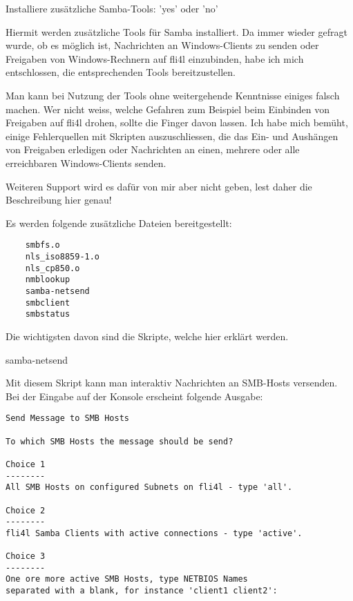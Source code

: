     Installiere zusätzliche Samba-Tools: 'yes' oder 'no'

    Hiermit werden zusätzliche Tools für Samba installiert.
    Da immer wieder gefragt wurde, ob es möglich ist, Nachrichten an
    Windows-Clients zu senden oder Freigaben von Windows-Rechnern auf fli4l
    einzubinden, habe ich mich entschlossen, die entsprechenden Tools
    bereitzustellen.

    Man kann bei Nutzung der Tools ohne weitergehende Kenntnisse einiges falsch
    machen. Wer nicht weiss, welche Gefahren zum Beispiel beim Einbinden von
    Freigaben auf fli4l drohen, sollte die Finger davon lassen. Ich habe mich
    bemüht, einige Fehlerquellen mit Skripten auszuschliessen, die das Ein-
    und Aushängen von Freigaben erledigen oder Nachrichten an einen, mehrere
    oder alle erreichbaren Windows-Clients senden.

    Weiteren Support wird es dafür von mir aber nicht geben, lest daher die
    Beschreibung hier genau!

    Es werden folgende zusätzliche Dateien bereitgestellt:

\begin{example}
\begin{verbatim}
    smbfs.o
    nls_iso8859-1.o
    nls_cp850.o
    nmblookup
    samba-netsend
    smbclient
    smbstatus
\end{verbatim}
\end{example}

    Die wichtigsten davon sind die Skripte, welche hier erklärt werden.

    samba-netsend

    Mit diesem Skript kann man interaktiv Nachrichten an SMB-Hosts versenden.
    Bei der Eingabe auf der Konsole erscheint folgende Ausgabe:

\begin{verbatim}
Send Message to SMB Hosts

To which SMB Hosts the message should be send?

Choice 1
--------
All SMB Hosts on configured Subnets on fli4l - type 'all'.

Choice 2
--------
fli4l Samba Clients with active connections - type 'active'.

Choice 3
--------
One ore more active SMB Hosts, type NETBIOS Names
separated with a blank, for instance 'client1 client2':
\end{verbatim}

